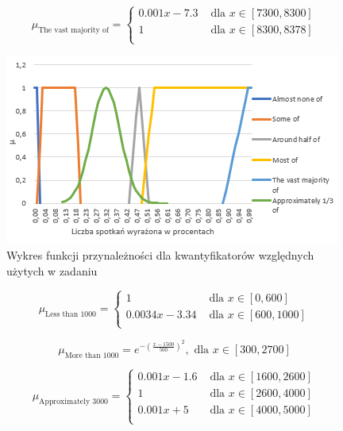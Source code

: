 \documentclass{classrep}
\begin{document}
  \begin{equation}
    \mu_{\text{The vast majority of}} =
      \begin{cases}
        0.001x - 7.3 & \text{ dla } x \in [7300,8300] \\
        1 & \text{ dla } x \in [8300,8378] \\
      \end{cases}  
  \end{equation}
  
 \begin{figure}[H]
 \centering
   \includegraphics{wzgledne.png}
   \caption{Wykres funkcji przynależności dla kwantyfikatorów względnych użytych w zadaniu}
 \end{figure}

  
 \begin{equation}
  \mu_{\text{Less than 1000}} =
    \begin{cases}
      1 & \text{ dla } x \in [0,600] \\
      0.0034x - 3.34 & \text{ dla } x \in [600,1000] \\
    \end{cases}  
\end{equation}

\begin{equation}
  \mu_{\text{More than 1000}} = e^{-(\frac{x-1500}{500})^2}, \text{ dla } x \in [300,2700]
\end{equation}

\begin{equation}
  \mu_{\text{Approximately 3000}} =
    \begin{cases}
      0.001x - 1.6 & \text{ dla } x \in [1600,2600] \\
      1 & \text{ dla } x \in [2600,4000] \\
      0.001x +5 & \text{ dla } x \in [4000,5000] \\
    \end{cases}  
\end{equation}
\end{document}
